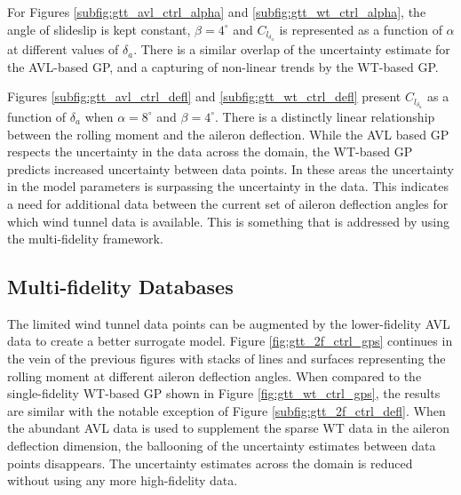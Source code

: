 For Figures \ref{subfig:gtt_avl_ctrl_alpha} and \ref{subfig:gtt_wt_ctrl_alpha}, the angle of slideslip is kept constant, $\beta=4^\circ$ and $C_{l_{\delta_a}}$ is represented as a function of $\alpha$ at different values of $\delta_a$.
There is a similar overlap of the uncertainty estimate for the AVL-based GP, and a capturing of non-linear trends by the WT-based GP. 

Figures \ref{subfig:gtt_avl_ctrl_defl} and \ref{subfig:gtt_wt_ctrl_defl} present $C_{l_{\delta_a}}$ as a function of $\delta_a$ when $\alpha = 8^\circ$ and $\beta = 4^\circ$.
There is a distinctly linear relationship between the rolling moment and the aileron deflection. 
While the AVL based GP respects the uncertainty in the data across the domain, the WT-based GP predicts increased uncertainty between data points. 
In these areas the uncertainty in the model parameters is surpassing the uncertainty in the data.
This indicates a need for additional data between the current set of aileron deflection angles for which wind tunnel data is available.
This is something that is addressed by using the multi-fidelity framework.

\subsection{Multi-fidelity Databases}
The limited wind tunnel data points can be augmented by the lower-fidelity AVL data to create a better surrogate model.
Figure \ref{fig:gtt_2f_ctrl_gps} continues in the vein of the previous figures with stacks of lines and surfaces representing the rolling moment at different aileron deflection angles. 
When compared to the single-fidelity WT-based GP shown in Figure \ref{fig:gtt_wt_ctrl_gps}, the results are similar with the notable exception of Figure \ref{subfig:gtt_2f_ctrl_defl}.
When the abundant AVL data is used to supplement the sparse WT data in the aileron deflection dimension, the ballooning of the uncertainty estimates between data points disappears. 
The uncertainty estimates across the domain is reduced without using any more high-fidelity data. 

